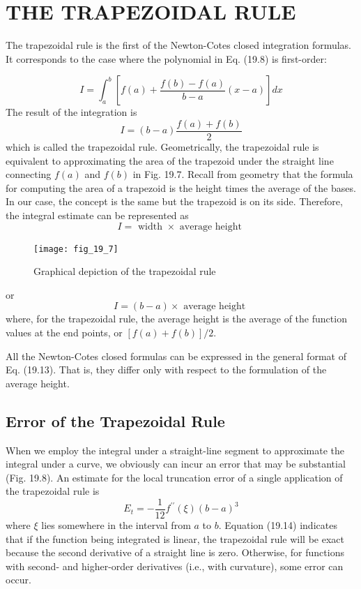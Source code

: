 \documentclass[../main.tex]{subfiles}
\begin{document}
\section{THE TRAPEZOIDAL RULE}

The trapezoidal rule is the first of the Newton-Cotes closed integration formulas. It corresponds to the case where the polynomial in Eq. (19.8) is first-order:

\begin{equation}
    \tag{19.10}
I=\int_{a}^{b}\left[f(a)+\frac{f(b)-f(a)}{b-a}(x-a)\right] d x
\end{equation}
The result of the integration is
\begin{equation}
    \tag{19.11}
I=(b-a) \frac{f(a)+f(b)}{2}
\end{equation}
which is called the trapezoidal rule.
Geometrically, the trapezoidal rule is equivalent to approximating the area of the trapezoid under the straight line connecting $f(a)$ and $f(b)$ in Fig. 19.7. Recall from geometry that the formula for computing the area of a trapezoid is the height times the average of the bases. In our case, the concept is the same but the trapezoid is on its side. Therefore, the integral estimate can be represented as
\begin{equation}
    \tag{19.12}
I=\text { width } \times \text { average height }
\end{equation}

\begin{figure}[H]
    \centering
    \texttt{[image: fig\_19\_7]}
   \caption{\textsf{Graphical depiction of the trapezoidal rule}}\label{fig:fig_19_7}
\end{figure}
or
\begin{equation}
    \tag{19.13}
	I=(b-a) \times \text { average height }
\end{equation}
where, for the trapezoidal rule, the average height is the average of the function values at the end points, or $[f(a)+f(b)] / 2$.

All the Newton-Cotes closed formulas can be expressed in the general format of Eq. (19.13). That is, they differ only with respect to the formulation of the average height.
\subsection{Error of the Trapezoidal Rule}
When we employ the integral under a straight-line segment to approximate the integral under a curve, we obviously can incur an error that may be substantial (Fig. 19.8). An estimate for the local truncation error of a single application of the trapezoidal rule is
\begin{equation}
    \tag{19.14}
E_{t}=-\frac{1}{12} f^{\prime \prime}(\xi)(b-a)^{3}
\end{equation}
where $\xi$ lies somewhere in the interval from $a$ to $b$. Equation (19.14) indicates that if the function being integrated is linear, the trapezoidal rule will be exact because the second derivative of a straight line is zero. Otherwise, for functions with second- and higher-order derivatives (i.e., with curvature), some error can occur.
\end{document}
